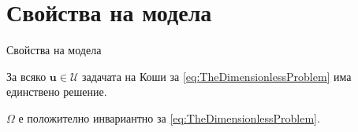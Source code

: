 \section{\hspace{1em}Свойства на модела}


\begin{frame}[c]{Свойства на модела}
  \begin{proposition}
    За всяко $\boldsymbol{u} \in \mathscr{U}$ задачата на Коши за \eqref{eq:TheDimensionlessProblem} има единствено решение.
  \end{proposition}
  \vspace{2em}


  \begin{proposition}
    $\Omega$ е положително инвариантно за \eqref{eq:TheDimensionlessProblem}.
  \end{proposition}

\end{frame}

